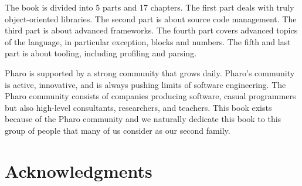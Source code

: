 \documentclass[a4paper,10pt,twoside]{book}
\begin{document}
The book is divided into 5 parts and 17 chapters. The first part deals with truly object-oriented libraries. The second part is about source code management. The third part is about advanced frameworks. The fourth part covers advanced topics of the language, in particular exception, blocks and numbers. The fifth and last part is about tooling, including profiling and parsing.


Pharo is supported by a strong community that grows daily. Pharo's community is active, innovative, and is always pushing limits of software engineering. The Pharo community consists of companies producing software, casual programmers but also high-level consultants, researchers, and teachers.
This book exists because of the Pharo community and we naturally dedicate this book to this group of people that many of us consider as our second family.


\section*{Acknowledgments}
\end{document}
